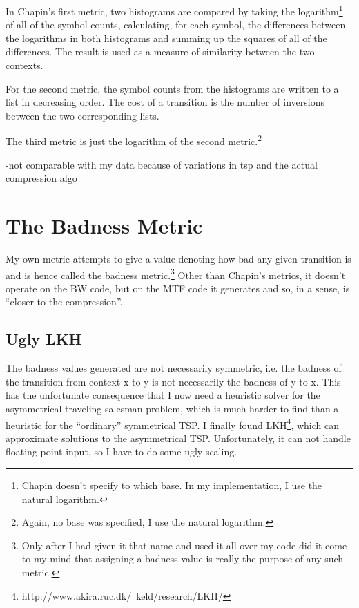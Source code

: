 \documentclass[a4paper]{scrreprt}
\begin{document}
In Chapin's first metric, two histograms are compared by taking the
logarithm\footnote{Chapin doesn't specify to which base. In my implementation,
I use the natural logarithm.} of all of the symbol counts, calculating, for each
symbol, the differences between the logarithms in both histograms and summing up
the squares of all of the differences. The result is used as a measure of
similarity between the two contexts.

For the second metric, the symbol counts from the histograms are written to a
list in decreasing order. The cost of a transition is the number of
inversions\cite{sleator1985amortized} between the two corresponding lists.

The third metric is just the logarithm of the second metric.\footnote{Again, no
base was specified, I use the natural logarithm.}

-not comparable with my data because of variations in tsp and the actual
compression algo

\section{The Badness Metric}

My own metric attempts to give a value denoting how bad any given transition is
and is hence called the badness metric.\footnote{Only after I had given it that
name and used it all over my code did it come to my mind that assigning a
badness value is really the purpose of any such metric.} Other than Chapin's
metrics, it doesn't operate on the BW code, but on the MTF code it generates
and so, in a sense, is ``closer to the compression''.


\subsection{Ugly LKH}

The badness values generated are not necessarily symmetric, i.e. the badness of
the transition from context x to y is not necessarily the badness of y to x.
This has the unfortunate consequence that I now need a heuristic solver for the
asymmetrical traveling salesman problem, which is much harder to find than a
heuristic for the ``ordinary'' symmetrical TSP. I finally found
LKH\cite{helsgaun2000lkh}\footnote{http://www.akira.ruc.dk/~keld/research/LKH/},
which can approximate solutions to the asymmetrical TSP. Unfortunately, it can
not handle floating point input, so I have to do some ugly scaling.
\end{document}
